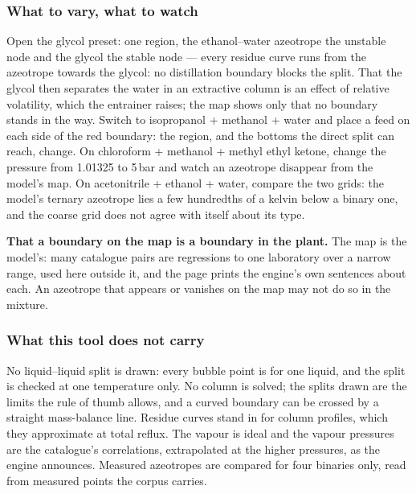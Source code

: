 \documentclass[11pt,a4paper]{article}
\begin{document}
\subsubsection*{What to vary, what to watch}

\begin{tryit}
Open the glycol preset: one region, the ethanol--water azeotrope the unstable
node and the glycol the stable node --- every residue curve runs from the
azeotrope towards the glycol: no distillation boundary blocks the split.  That
the glycol then separates the water in an extractive column is an effect of
relative volatility, which the entrainer raises; the map shows only that no
boundary stands in the way.  Switch to isopropanol + methanol + water and place a feed
on each side of the red boundary: the region, and the bottoms the direct split
can reach, change.  On chloroform + methanol + methyl ethyl ketone, change the
pressure from 1.01325 to 5\,bar and watch an azeotrope disappear from the
model's map.  On acetonitrile + ethanol + water, compare the two grids: the
model's ternary azeotrope lies a few hundredths of a kelvin below a binary one,
and the coarse grid does not agree with itself about its type.
\end{tryit}

\begin{pitfall}
\textbf{That a boundary on the map is a boundary in the plant.}  The map is the
model's: many catalogue pairs are regressions to one laboratory over a narrow
range, used here outside it, and the page prints the engine's own sentences
about each.  An azeotrope that appears or vanishes on the map may not do so in
the mixture.
\end{pitfall}

\subsubsection*{What this tool does not carry}

No liquid--liquid split is drawn: every bubble point is for one liquid, and the
split is checked at one temperature only.  No column is solved; the splits drawn
are the limits the rule of thumb allows, and a curved boundary can be crossed by
a straight mass-balance line.  Residue curves stand in for column profiles,
which they approximate at total reflux.  The vapour is ideal and the vapour
pressures are the catalogue's correlations, extrapolated at the higher
pressures, as the engine announces.  Measured azeotropes are compared for four
binaries only, read from measured points the corpus carries.
\end{document}
